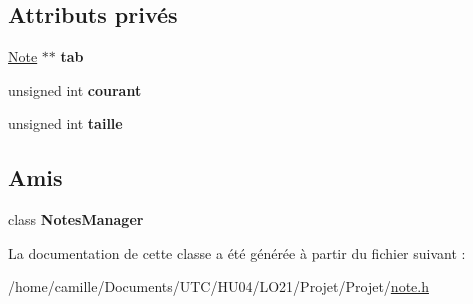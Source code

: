 \subsection*{Attributs privés}
\begin{DoxyCompactItemize}
\item 
\hypertarget{class_notes_manager_1_1_iterator_a5c9c9fbed536d945945dd0610730d7dd}{\hyperlink{class_note}{Note} $\ast$$\ast$ {\bfseries tab}}\label{class_notes_manager_1_1_iterator_a5c9c9fbed536d945945dd0610730d7dd}

\item 
\hypertarget{class_notes_manager_1_1_iterator_a850f87a5bd51749f482fef725f956af3}{unsigned int {\bfseries courant}}\label{class_notes_manager_1_1_iterator_a850f87a5bd51749f482fef725f956af3}

\item 
\hypertarget{class_notes_manager_1_1_iterator_a4384545d0df17a4003b9c5212aa4c64f}{unsigned int {\bfseries taille}}\label{class_notes_manager_1_1_iterator_a4384545d0df17a4003b9c5212aa4c64f}

\end{DoxyCompactItemize}
\subsection*{Amis}
\begin{DoxyCompactItemize}
\item 
\hypertarget{class_notes_manager_1_1_iterator_a017a5144e8cfa6087305055ab968ef41}{class {\bfseries Notes\-Manager}}\label{class_notes_manager_1_1_iterator_a017a5144e8cfa6087305055ab968ef41}

\end{DoxyCompactItemize}


La documentation de cette classe a été générée à partir du fichier suivant \-:\begin{DoxyCompactItemize}
\item 
/home/camille/\-Documents/\-U\-T\-C/\-H\-U04/\-L\-O21/\-Projet/\-Projet/\hyperlink{note_8h}{note.\-h}\end{DoxyCompactItemize}
